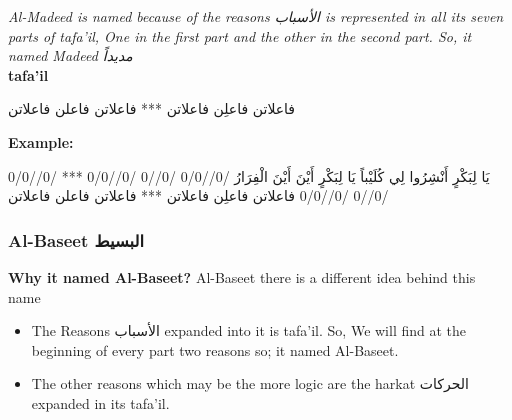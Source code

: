 \textit{Al-Madeed is named because of the reasons \textarabic{الأسباب} is represented in all its seven parts of tafa'il, One in the first part and the other in the second part. So, it named Madeed \textarabic{مديداً}\cite{Alkafi1994}
  }\\


\textbf{tafa'il}

\begin{Arabic}
	\begin{traditionalpoem*}
فاعلاتن فاعلِن فاعلاتن *** فاعلاتن فاعلن فاعلاتن


	\end{traditionalpoem*}
      \end{Arabic}


\textbf{Example:}

\begin{Arabic}
	\begin{traditionalpoem*}
    يَا لِبَكْرٍ أَنْشِرُوا لِي كُلَيْباً	يَا لِبَكْرٍ أَيْنَ أَيْنَ الْفِرَارُ
/0//0/0 /0//0 /0//0/0 *** /0//0/0 /0//0 /0//0/0
فاعلاتن فاعلِن فاعلاتن *** فاعلاتن فاعلن فاعلاتن

	\end{traditionalpoem*}
      \end{Arabic}
\newpage




\subsubsection{Al-Baseet \textarabic{البسيط}}

\textbf{Why it named Al-Baseet?}
Al-Baseet there is a different idea behind this name
\begin{itemize}
\item The Reasons \textarabic{الأسباب} expanded into it is tafa'il. So, We will find at the beginning of every part two reasons so; it named Al-Baseet.
\item The other reasons which may be the more logic are the harkat  \textarabic{الحركات} expanded in its tafa'il.\cite{Alkafi1994}
  
\end{itemize}



